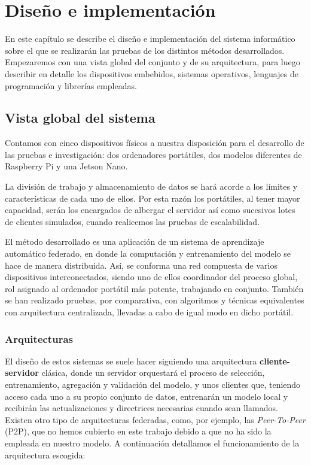 \documentclass[00-Trabajo_Final.tex]{subfiles}
\begin{document}
\newpage

\section{Diseño e implementación}
En este capítulo se describe el diseño e implementación del sistema informático sobre el que se realizarán las pruebas de los distintos métodos desarrollados. Empezaremos con una vista global del conjunto y de su arquitectura, para luego describir en detalle los dispositivos embebidos, sistemas operativos, lenguajes de programación y librerías empleadas.

\subsection{Vista global del sistema}

Contamos con cinco dispositivos físicos a nuestra disposición para el desarrollo de las pruebas e investigación: dos ordenadores portátiles, dos modelos diferentes de Raspberry Pi y una Jetson Nano.

La división de trabajo y almacenamiento de datos se hará acorde a los límites y características de cada uno de ellos. Por esta razón los portátiles, al tener mayor capacidad, serán los encargados de albergar el servidor así como sucesivos lotes de clientes simulados, cuando realicemos las pruebas de escalabilidad.

El método desarrollado es una aplicación de un sistema de aprendizaje automático federado, en donde la computación y entrenamiento del modelo se hace de manera distribuida. Así, se conforma una red compuesta de varios dispositivos interconectados, siendo uno de ellos coordinador del proceso global, rol asignado al ordenador portátil más potente, trabajando en conjunto. También se han realizado pruebas, por comparativa, con algoritmos y técnicas equivalentes con arquitectura centralizada, llevadas a cabo de igual modo en dicho portátil.

\subsubsection*{Arquitecturas}
El diseño de estos sistemas se suele hacer siguiendo una arquitectura \textbf{cliente-servidor} clásica, donde un servidor orquestará el proceso de selección, entrenamiento, agregación y validación del modelo, y unos clientes que, teniendo acceso cada uno a su propio conjunto de datos, entrenarán un modelo local y recibirán las actualizaciones y directrices necesarias cuando sean llamados. Existen otro tipo de arquitecturas federadas, como, por ejemplo, las \textit{Peer-To-Peer} (P2P), que no hemos cubierto en este trabajo debido a que no ha sido la empleada en nuestro modelo. A continuación detallamos el funcionamiento de la arquitectura escogida:
\end{document}
